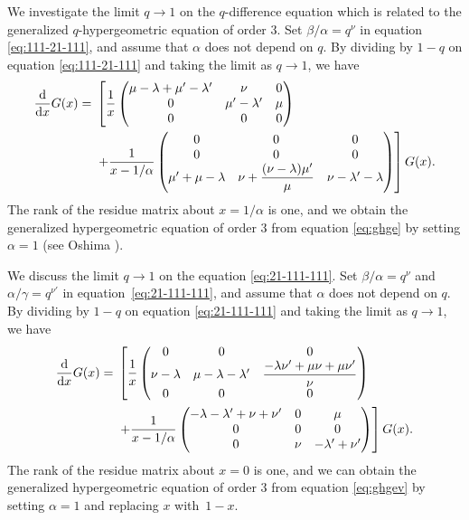\documentclass[pdftex]{sigma}
\numberwithin{equation}{section}
\theoremstyle{definition}
\begin{document}
We investigate the limit $q \to 1$ on the $q$-difference equation which is related to the generalized $q$-hypergeometric equation of order $3$.
Set $\beta/\alpha = q^{\nu}$ in equation \eqref{eq:111-21-111}, and assume that $\alpha $ does not depend on $q$.
By dividing by $1-q$ on equation \eqref{eq:111-21-111} and taking the limit as $q \to 1$, we have
\begin{align}
\frac{{\rm d}}{{\rm d}x} G (x)
={} &\left[ \frac{1}{x} \begin{pmatrix}
 \mu - \lambda + \mu' - \lambda' & \nu & 0 \\
 0 & \mu' - \lambda' & \mu \\
 0 & 0 & 0
 \end{pmatrix} \nonumber\right. \\
&\left. + \frac{1}{x-1/\alpha} \begin{pmatrix}
 0 & 0 & 0 \\
 0 & 0 & 0 \\
\mu ' + \mu - \lambda & \displaystyle \nu + \frac{(\nu - \lambda) \mu '}{\mu } & \nu - \lambda ' - \lambda
 \end{pmatrix}
\right] G (x). \label{eq:ghge}
\end{align}
The rank of the residue matrix about $x=1/\alpha $ is one, and we obtain the generalized hypergeometric equation of order $3$ from equation \eqref{eq:ghge} by setting $\alpha =1$ (see Oshima \cite[Example~5.3]{O}).

We discuss the limit $q \to 1$ on the equation \eqref{eq:21-111-111}.
Set $\beta/\alpha = q^{\nu}$ and $\alpha/\gamma = q^{\nu'}$ in equation~\eqref{eq:21-111-111}, and assume that $\alpha $ does not depend on $q$.
By dividing by $1-q$ on equation \eqref{eq:21-111-111} and taking the limit as $q \to 1$, we have
\begin{align}
\frac{{\rm d}}{{\rm d}x} G (x)
={}& \left[ \frac{1}{x} \begin{pmatrix}
 0 & 0 & 0 \\
 \nu - \lambda & \mu - \lambda - \lambda' & \displaystyle \frac{-\lambda\nu' + \mu\nu + \mu\nu'}{\nu} \\
 0 & 0 & 0
 \end{pmatrix} \nonumber\right. \\
&\left. + \frac{1}{x-1/\alpha } \begin{pmatrix}
 -\lambda - \lambda' + \nu + \nu' & 0 & \mu \\
 0 & 0 & 0 \\
 0 & \nu & -\lambda' + \nu'
 \end{pmatrix}
\right] G(x). \label{eq:ghgev}
\end{align}
The rank of the residue matrix about $x=0 $ is one, and we can obtain the generalized hypergeometric equation of order $3$ from equation \eqref{eq:ghgev} by setting $\alpha =1$ and replacing $x$ with~${1-x}$.
\end{document}
